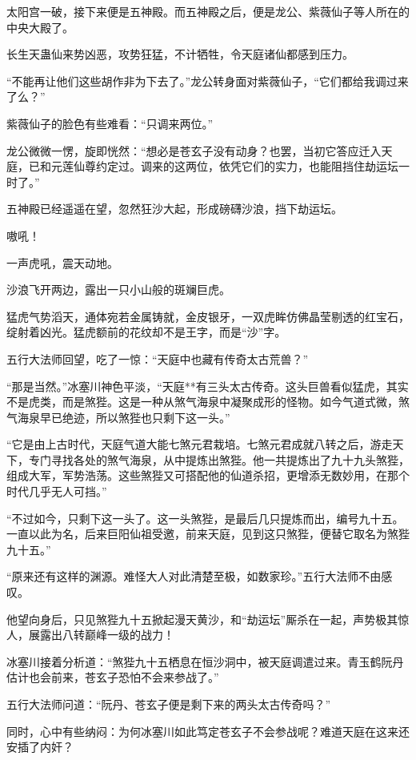 
\begin{this_body}

太阳宫一破，接下来便是五神殿。而五神殿之后，便是龙公、紫薇仙子等人所在的中央大殿了。

长生天蛊仙来势凶恶，攻势狂猛，不计牺牲，令天庭诸仙都感到压力。

“不能再让他们这些胡作非为下去了。”龙公转身面对紫薇仙子，“它们都给我调过来了么？”

紫薇仙子的脸色有些难看：“只调来两位。”

龙公微微一愣，旋即恍然：“想必是苍玄子没有动身？也罢，当初它答应迁入天庭，已和元莲仙尊约定过。调来的这两位，依凭它们的实力，也能阻挡住劫运坛一时了。”

五神殿已经遥遥在望，忽然狂沙大起，形成磅礴沙浪，挡下劫运坛。

嗷吼！

一声虎吼，震天动地。

沙浪飞开两边，露出一只小山般的斑斓巨虎。

猛虎气势滔天，通体宛若金属铸就，金皮银牙，一双虎眸仿佛晶莹剔透的红宝石，绽射着凶光。猛虎额前的花纹却不是王字，而是“沙”字。

五行大法师回望，吃了一惊：“天庭中也藏有传奇太古荒兽？”

“那是当然。”冰塞川神色平淡，“天庭**有三头太古传奇。这头巨兽看似猛虎，其实不是虎类，而是煞狴。这是一种从煞气海泉中凝聚成形的怪物。如今气道式微，煞气海泉早已绝迹，所以煞狴也只剩下这一头。”

“它是由上古时代，天庭气道大能七煞元君栽培。七煞元君成就八转之后，游走天下，专门寻找各处的煞气海泉，从中提炼出煞狴。他一共提炼出了九十九头煞狴，组成大军，军势浩荡。这些煞狴又可搭配他的仙道杀招，更增添无数妙用，在那个时代几乎无人可挡。”

“不过如今，只剩下这一头了。这一头煞狴，是最后几只提炼而出，编号九十五。一直以此为名，后来巨阳仙祖受邀，前来天庭，见到这只煞狴，便替它取名为煞狴九十五。”

“原来还有这样的渊源。难怪大人对此清楚至极，如数家珍。”五行大法师不由感叹。

他望向身后，只见煞狴九十五掀起漫天黄沙，和“劫运坛”厮杀在一起，声势极其惊人，展露出八转巅峰一级的战力！

冰塞川接着分析道：“煞狴九十五栖息在恒沙洞中，被天庭调遣过来。青玉鹤阮丹估计也会前来，苍玄子恐怕不会来参战了。”

五行大法师问道：“阮丹、苍玄子便是剩下来的两头太古传奇吗？”

同时，心中有些纳闷：为何冰塞川如此笃定苍玄子不会参战呢？难道天庭在这来还安插了内奸？


\end{this_body}
